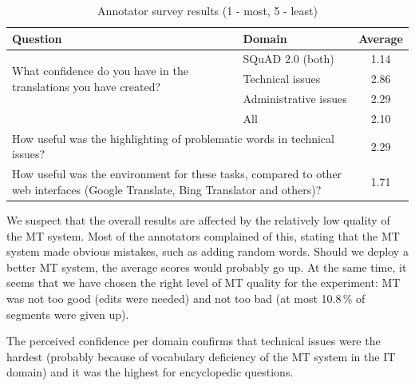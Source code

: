 \begin{table}[ht]
    \centering
    \begin{tabular}{| l | l | c |}
        \hline
        Question & Domain & Average \\
        \hline
        \multirow{3}{*}{\hspace{-0.1cm}\parbox{60mm}{\vspace{0.1cm}What confidence do you have in the translations you have created?}\hspace{-0.1cm}} & SQuAD 2.0 (both) & 1.14  \\
         & Technical issues & 2.86 \\
         & Administrative issues \hspace{-0.2cm} & 2.29 \\
         & All & 2.10 \\
         \hline \hline
         \multicolumn{2}{|l|}{\hspace{-0.1cm}\parbox{100mm}{\vspace{0.1cm}How useful was the highlighting of problematic words in technical issues?\\ \textbf{} \vspace{-0.2cm}}} & 2.29 \\
         \hline \hline
         \multicolumn{2}{|l|}{\hspace{-0.1cm}\parbox{100mm}{\vspace{0.1cm}How useful was the environment for these tasks, compared to other web interfaces (Google Translate, Bing Translator and others)?}} & 1.71 \\
         \hline
    \end{tabular}
    \caption{\label{tab:survey} Annotator survey results (1 - most, 5 - least)}
\end{table}

We suspect that the overall results are affected by the relatively low quality of the MT system. Most of the annotators complained of this, stating that the MT system made obvious mistakes, such as adding random words. Should we deploy a better MT system, the average scores would probably go up. At the same time, it seems that we have chosen the right level of MT quality for the experiment: MT was not too good (edits were needed) and not too bad (at most 10.8\,\% of segments were given up).

The perceived confidence per domain confirms that technical issues were the hardest (probably because of vocabulary deficiency of the MT system in the IT domain) and it was the highest for encyclopedic questions.


